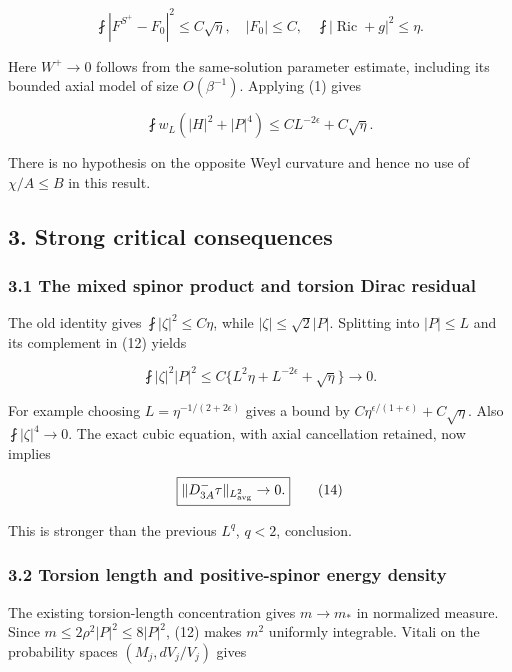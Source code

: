 \documentclass[11pt]{article}
\begin{document}
\[
 \fint|F^{S^+}-F_0|^2\le C\sqrt\eta,
 \quad |F_0|\le C,
 \quad \fint|\operatorname{Ric}+g|^2\le\eta.
\tag{11}
\]

Here \(W^+\to0\) follows from the same-solution parameter estimate,
including its bounded axial model of size \(O(\beta^{-1})\). Applying
(1) gives

\[
 \boxed{\fint w_L(|H|^2+|P|^4)
         \le C L^{-2\epsilon}+C\sqrt\eta.}\tag{12}
\]

There is no hypothesis on the opposite Weyl curvature and hence no use
of \(\chi/A\le B\) in this result.

\hypertarget{strong-critical-consequences}{%
\subsection{3. Strong critical
consequences}\label{strong-critical-consequences}}

\hypertarget{the-mixed-spinor-product-and-torsion-dirac-residual}{%
\subsubsection{3.1 The mixed spinor product and torsion Dirac
residual}\label{the-mixed-spinor-product-and-torsion-dirac-residual}}

The old identity gives \(\fint|\zeta|^2\le C\eta\), while
\(|\zeta|\le\sqrt2|P|\). Splitting into \(|P|\le L\) and its complement
in (12) yields

\[
 \fint|\zeta|^2|P|^2
 \le C\{L^2\eta+L^{-2\epsilon}+\sqrt\eta\}\to0.
\tag{13}
\]

For example choosing \(L=\eta^{-1/(2+2\epsilon)}\) gives a bound by
\(C\eta^{\epsilon/(1+\epsilon)}+C\sqrt\eta\). Also
\(\fint|\zeta|^4\to0\). The exact cubic equation, with axial
cancellation retained, now implies

\[
 \boxed{\|D^-_{3A}\tau\|_{L^2_{\rm avg}}\to0.}\tag{14}
\]

This is stronger than the previous \(L^q\), \(q<2\), conclusion.

\hypertarget{torsion-length-and-positive-spinor-energy-density}{%
\subsubsection{3.2 Torsion length and positive-spinor energy
density}\label{torsion-length-and-positive-spinor-energy-density}}

The existing torsion-length concentration gives \(m\to m_*\) in
normalized measure. Since \(m\le2\rho^2|P|^2\le8|P|^2\), (12) makes
\(m^2\) uniformly integrable. Vitali on the probability spaces
\((M_j,dV_j/V_j)\) gives
\end{document}
